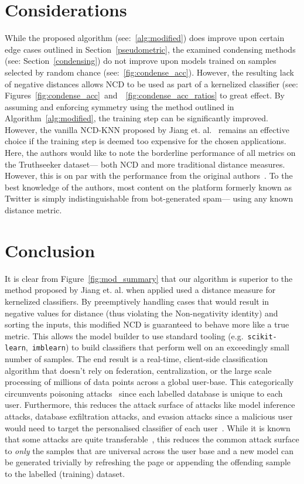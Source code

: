 \documentclass[conference]{IEEEtran}
\begin{document}
\section{Considerations}
\label{considerations}
While the proposed algorithm (see:~\ref{alg:modified}) does improve upon certain edge cases outlined in Section~\ref{pseudometric}, the examined condensing methods (see: Section~\ref{condensing}) do not improve upon models trained on samples selected by random chance (see:~\ref{fig:condense_acc}). However, the resulting lack of negative distances allows NCD to be used as part of a kernelized classifier (see: Figures~\ref{fig:condense_acc}~and~~\ref{fig:condense_acc_ratios} to great effect. 
By assuming and enforcing symmetry using the method outlined in Algorithm~\ref{alg:modified}, the training step can be significantly improved.
However, the vanilla NCD-KNN proposed by Jiang et. al.~\cite{jiang2022less} remains an effective choice if the training step is deemed too expensive for the chosen applications.
Here, the authors would like to note the borderline performance of all metrics on the Truthseeker dataset--- both NCD and more traditional distance measures. However, this is on par with the performance from the original authors~\cite{truthseeker}. To the best knowledge of the authors, most content on the platform formerly known as Twitter is simply indistinguishable from bot-generated spam--- using any known distance metric.


\section{Conclusion}
It is clear from Figure~\ref{fig:mod_summary} that our algorithm is superior to the method proposed by Jiang et. al. when applied used a distance measure for kernelized classifiers. By preemptively handling cases that would result in negative values for distance (thus violating the Non-negativity identity) and sorting the inputs, this modified NCD is guaranteed to behave more like a true metric. 
This allows the model builder to use standard tooling (e.g.~\texttt{scikit-learn},~\texttt{imblearn}) to build classifiers that perform well on an exceedingly small number of samples. The end result is a real-time, client-side classification algorithm that doesn't rely on federation, centralization, or the large scale processing of millions of data points across a global user-base. 
This categorically circumvents poisoning attacks~\cite{biggio_poisoning_2013} since each labelled database is unique to each user. 
Furthermore, this reduces the attack surface of attacks like model inference attacks, database exfiltration attacks, and evasion attacks since a malicious user would need to target the personalised classifier of each user~\cite{biggio_evasion_2013,deepfool,chakraborty_adversarial_2018}. 
While it is known that some attacks are quite transferable~\cite{wang2021enhancing}, this reduces the common attack surface to \textit{only} the samples that are universal across the user base and a new model can be generated trivially by refreshing the page or appending the offending sample to the labelled (training) dataset. 


\label{conclusion}



\newpage


% 
% 
% 
% 
\end{document}
